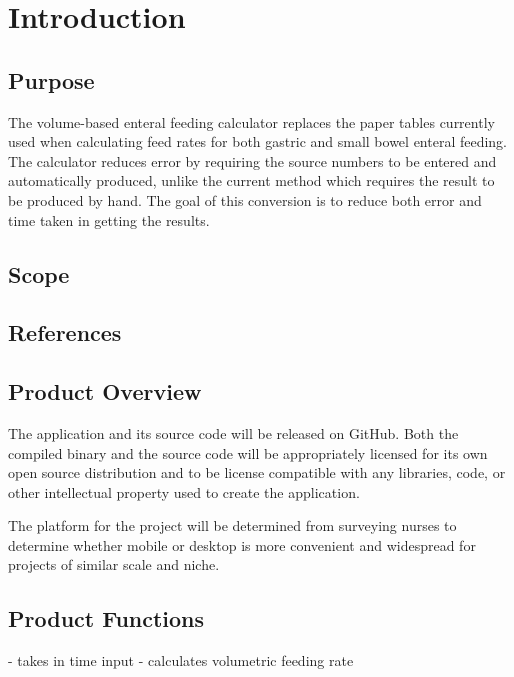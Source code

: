 \documentclass[10pt,draftclsnofoot,onecolumn]{IEEEtran}
\begin{document}
\title{}
\author{Alison Jones \& Parker Okonek}
\maketitle
\begin{abstract}
\end{abstract}
\newpage
\section{Introduction}

\subsection{Purpose}
The volume-based enteral feeding calculator replaces the paper tables currently used when 
calculating feed rates for both gastric and small bowel enteral feeding. The calculator reduces
error by requiring the source numbers to be entered and automatically produced, unlike the current
method which requires the result to be produced by hand. The goal of this conversion is to reduce both
error and time taken in getting the results.

\subsection{Scope}

\subsection{References}

\subsection{Product Overview}
The application and its source code will be released on GitHub. Both the compiled binary and the source code
will be appropriately licensed for its own open source distribution and to be license compatible with any 
libraries, code, or other intellectual property used to create the application.

The platform for the project will be determined from surveying nurses to determine whether mobile or desktop
is more convenient and widespread for projects of similar scale and niche.

\subsection{Product Functions}
- takes in time input
- calculates volumetric feeding rate
\end{document}
